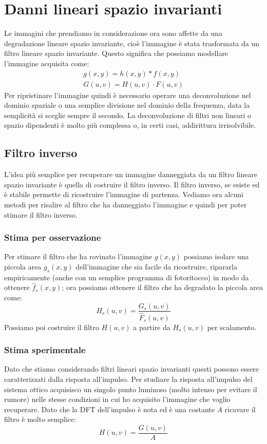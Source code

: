 \section{Danni lineari spazio invarianti}
Le immagini che prendiamo in considerazione ora sono affette da una degradazione lineare spazio invariante, cioè l'immagine è stata trasformata da un filtro lineare spazio invariante. Questo significa che possiamo modellare l'immagine acquisita come:
\begin{gather}
	g(x,y) = h(x,y)*f(x,y)\\
	G(u,v) = H(u,v)\cdot F(u,v)
\end{gather}
Per ripristinare l'immagine quindi è necessario operare una deconvoluzione nel dominio spaziale o una semplice divisione nel dominio della frequenza, data la semplicità si sceglie sempre il secondo. La deconvoluzione di filtri non lineari o spazio dipendenti è molto più complessa o, in certi casi, addirittura irrisolvibile.

\subsection{Filtro inverso}
L'idea più semplice per recuperare un immagine danneggiata da un filtro lineare spazio invariante è quella di costruire il filtro inverso. Il filtro inverso, se esiste ed è stabile permette di ricostruire l'immagine di partenza. Vediamo ora alcuni metodi per risalire al filtro che ha danneggiato l'immagine e quindi per poter stimare il filtro inverso.

\subsubsection{Stima per osservazione}
Per stimare il filtro che ha rovinato l'immagine $g(x,y)$ possiamo isolare una piccola area $g_s(x,y)$ dell'immagine che sia facile da ricostruire, ripararla empiricamente (anche con un semplice programma di fotoritocco) in modo da ottenere $\hat{f}_s(x,y)$; ora possiamo ottenere il filtro che ha degradato la piccola area come:
\begin{equation}
	H_s(u,v) = \frac{G_s(u,v)}{\hat{F}_s(u,v)}
\end{equation}
Possiamo poi costruire il filtro $H(u,v)$ a partire da $H_s(u,v)$ per scalamento.

\subsubsection{Stima sperimentale}
Dato che stiamo considerando filtri lineari spazio invarianti questi possono essere caratterizzati dalla risposta all'impulso. Per studiare la risposta all'impulso del sistema ottico acquisisco un singolo punto luminoso (molto intenso per evitare il rumore) nelle stesse condizioni in cui ho acquisito l'immagine che voglio recuperare. Dato che la DFT dell'impulso è nota ed è una costante $A$ ricavare il filtro è molto semplice:
\begin{equation}
	H(u,v) = \frac{G(u,v)}{A}
\end{equation}

